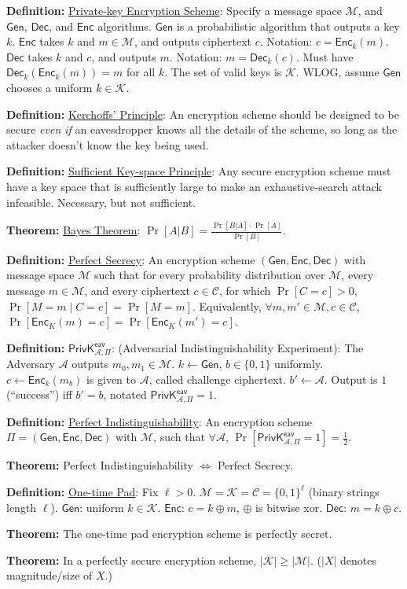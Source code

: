 \documentclass[10pt]{article}
\newcommand{\AAA}{\mathcal{A}}
\newcommand{\CCC}{\mathcal{C}}
\newcommand{\KKK}{\mathcal{K}}
\newcommand{\MMM}{\mathcal{M}}
\newcommand{\defn}[1]{{\bf Definition:} \underline{#1}}
\newcommand{\thm}[1]{{\bf Theorem:} \underline{#1}}
\newcommand{\Enc}{\mathsf{Enc}}
\newcommand{\Dec}{\mathsf{Dec}}
\newcommand{\Gen}{\mathsf{Gen}}
\newcommand{\GenEncDec}{(\Gen,\Enc,\Dec)}
\newcommand{\ExptEavArgs}[2]{\mathsf{PrivK}^{\mathsf{eav}}_{#1,#2}}
\newcommand{\ExptEav}{\ExptEavArgs{\AAA}{\Pi}}
\newcommand{\xor}{\oplus}
\newcommand{\from}{\leftarrow}
\begin{document}
\footnotesize
\begin{multicols}{3}

\defn{Private-key Encryption Scheme}: Specify a message space $\MMM$, and $\Gen$, $\Dec$, and $\Enc$ algorithms. $\Gen$ is a probabilistic algorithm that outputs a key $k$. $\Enc$ takes $k$ and $m\in\MMM$, and outputs ciphertext $c$. Notation: $c=\Enc_k(m)$. $\Dec$ takes $k$ and $c$, and outputs $m$. Notation: $m=\Dec_k(c)$. Must have $\Dec_k(\Enc_k(m))=m$ for all $k$. The set of valid keys is $\KKK$. WLOG, assume $\Gen$ chooses a uniform $k\in\KKK$.

\defn{Kerchoffs' Principle}: An encryption scheme should be designed to be secure {\it even if} an eavesdropper knows all the details of the scheme, so long as the attacker doesn't know the key being used. 

\defn{Sufficient Key-space Principle}: Any secure encryption scheme must have a key space that is sufficiently large to make an exhaustive-search attack infeasible. Necessary, but not sufficient.

\thm{Bayes Theorem}: $\Pr[A|B]=\frac{\Pr[B|A]\cdot\Pr[A]}{\Pr[B]}$.

\defn{Perfect Secrecy}: An encryption scheme $\GenEncDec$ with message space $\MMM$ such that for every probability distribution over $\MMM$, every message $m\in \MMM$, and every ciphertext $c\in\CCC$, for which $\Pr[C=c]>0$, $\Pr[M=m\mid C=c]=\Pr[M=m]$. Equivalently, $\forall m,m'\in\MMM,c\in\CCC$, $\Pr[\Enc_K(m)=c]=\Pr[\Enc_K(m')=c]$.

\defn{$\ExptEav$}: (Adversarial Indistinguishability Experiment): The Adversary $\AAA$ outputs $m_0,m_1\in\MMM$. $k\from\Gen$, $b\in\{0,1\}$ uniformly. $c\from\Enc_k(m_b)$ is given to $\AAA$, called challenge ciphertext. $b'\from\AAA$. Output is $1$ (``success'') iff $b'=b$, notated $\ExptEav=1$.

\defn{Perfect Indistinguishability}: An encryption scheme $\Pi=\GenEncDec$ with $\MMM$, such that $\forall\AAA$, $\Pr[\ExptEav=1]=\frac{1}{2}$.

\thm{}Perfect Indistinguishability $\Leftrightarrow$ Perfect Secrecy.

\defn{One-time Pad}: Fix $\ell>0$. $\MMM=\KKK=\CCC=\{0,1\}^\ell$ (binary strings length $\ell$). $\Gen$: uniform $k\in\KKK$. $\Enc$: $c=k\xor m$, $\xor$ is bitwise xor. $\Dec$: $m=k\xor c$.

\thm{}The one-time pad encryption scheme is perfectly secret.

\thm{}In a perfectly secure encryption scheme, $|\KKK|\geq|\MMM|$. ($|X|$ denotes magnitude/size of $X$.)


\end{multicols}
\end{document}
